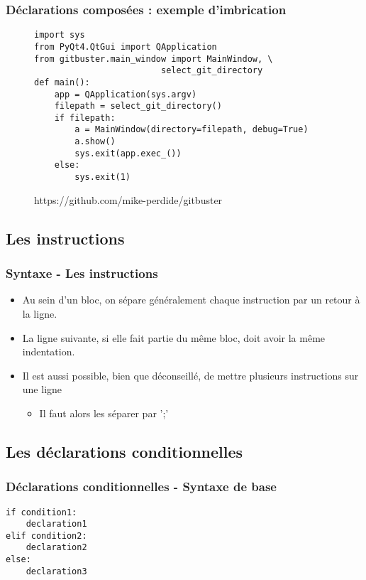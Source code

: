 \begin{frame}[fragile]
  \frametitle{Déclarations composées : exemple d'imbrication}
\begin{figure}
\tiny{\begin{lstlisting}import sys
from PyQt4.QtGui import QApplication
from gitbuster.main_window import MainWindow, \
                         select_git_directory
def main():
    app = QApplication(sys.argv)
    filepath = select_git_directory()
    if filepath:
        a = MainWindow(directory=filepath, debug=True)
        a.show()
        sys.exit(app.exec_())
    else:
        sys.exit(1)
  \end{lstlisting}}
\def\figurename{Code source de gitbuster}
\caption{https://github.com/mike-perdide/gitbuster}
\end{figure}
\end{frame}

\subsection{Les instructions}
\begin{frame}
  \frametitle{Syntaxe - Les instructions}
  \begin{itemize}
    \item<1-> Au sein d'un bloc, on sépare généralement chaque instruction par un retour à la ligne.
    \item<2-> La ligne suivante, si elle fait partie du même bloc, doit avoir la même indentation.
    \item<3-> Il est aussi possible, bien que déconseillé, de mettre plusieurs instructions sur une ligne
    \begin{itemize}
      \item<4-> Il faut alors les séparer par ';'
    \end{itemize}
  \end{itemize}
\end{frame}

\subsection{Les déclarations conditionnelles}
\begin{frame}[fragile]
  \frametitle{Déclarations conditionnelles - Syntaxe de base}
  \begin{lstlisting}
if condition1:
    declaration1
elif condition2:
    declaration2
else:
    declaration3
  \end{lstlisting}
\end{frame}

